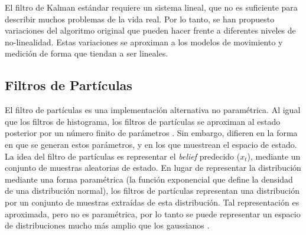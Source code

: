 
El filtro de Kalman estándar requiere un sistema lineal, que no es suficiente para 
describir muchos problemas de la vida real. Por lo tanto, se han propuesto 
variaciones del algoritmo original que pueden hacer frente a diferentes niveles de 
no-linealidad. Estas variaciones se aproximan a los modelos de movimiento y medición 
de forma que tiendan a ser lineales.


\subsection{Filtros de Part\'iculas}
El filtro de part\'iculas es una implementaci\'on alternativa no param\'etrica. Al 
igual que los filtros de histograma, los filtros de part\'iculas se aproximan al 
estado posterior por un n\'umero finito de par\'ametros \cite{arulampalam2002tutorial}. Sin 
embargo, difieren en la forma en que se generan estos par\'ametros, y en los que 
muestrean el espacio de estado. La idea del filtro de part\'iculas es representar 
el \textit{belief} predecido ($x_{t}$), mediante un conjunto de muestras aleatorias de 
estado. En lugar de representar la distribuci\'on mediante una forma param\'etrica 
(la funci\'on exponencial que define la densidad de una distribuci\'on normal), los 
filtros de part\'iculas representan una distribuci\'on por un conjunto de muestras 
extra\'idas de esta distribuci\'on. Tal representaci\'on es aproximada, pero 
no es param\'etrica, por lo tanto se puede representar un espacio de distribuciones 
mucho m\'as amplio que los gaussianos \cite{calle2014navegacion}.


